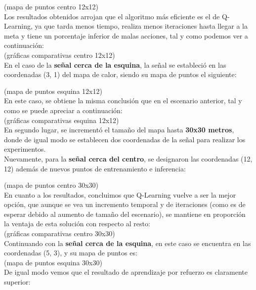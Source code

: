 (mapa de puntos centro 12x12)\\

Los resultados obtenidos arrojan que el algoritmo más eficiente es el de Q-Learning, ya que tarda menos tiempo, realiza menos iteraciones hasta llegar a la meta y tiene un porcentaje inferior de malas acciones, tal y como podemos ver a continuación:\\

(gráficas comparativas centro 12x12)\\

En el caso de la \textbf{señal cerca de la esquina}, la señal se estableció en las coordenadas (3, 1) del mapa de calor, siendo su mapa de puntos el siguiente:

(mapa de puntos esquina 12x12)\\

En este caso, se obtiene la misma conclusión que en el escenario anterior, tal y como se puede apreciar a continuación:\\

(gráficas comparativas esquina 12x12)\\

En segundo lugar, se incrementó el tamaño del mapa hasta \textbf{30x30 metros}, donde de igual modo se establecen dos coordenadas de la señal para realizar los experimentos.\\

Nuevamente, para la \textbf{señal cerca del centro}, se designaron las coordenadas (12, 12) además de nuevos puntos de entrenamiento e inferencia:

(mapa de puntos centro 30x30)\\

En cuanto a los resultados, concluimos que Q-Learning vuelve a ser la mejor opción, que aunque se vea un incremento temporal y de iteraciones (como es de esperar debido al aumento de tamaño del escenario), se mantiene en proporción la ventaja de esta solución con respecto al resto:\\

(gráficas comparativas centro 30x30)\\

Continuando con la \textbf{señal cerca de la esquina}, en este caso se encuentra en las coordenadas (5, 3), y su mapa de puntos es:\\

(mapa de puntos esquina 30x30)\\

De igual modo vemos que el resultado de aprendizaje por refuerzo es claramente superior:\\

